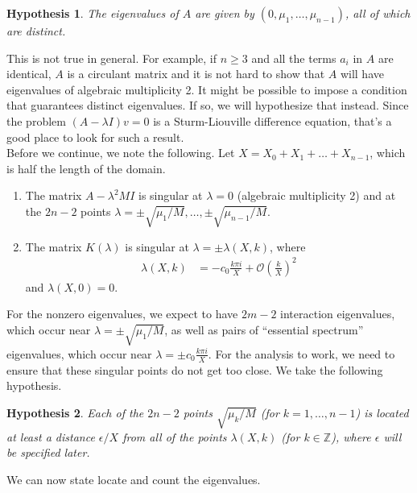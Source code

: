 \documentclass[12pt]{article}
\def\Z{{\mathbb Z}}
\newtheorem{hypothesis}{Hypothesis}
\begin{document}
\begin{hypothesis}\label{eigAdistinct}
The eigenvalues of $A$ are given by $(0, \mu_1, \dots, \mu_{n-1})$, all of which are distinct.
\end{hypothesis}

This is not true in general. For example, if $n \geq 3$ and all the terms $a_i$ in $A$ are identical, $A$ is a circulant matrix and it is not hard to show that $A$ will have eigenvalues of algebraic multiplicity 2. It might be possible to impose a condition that guarantees distinct eigenvalues. If so, we will hypothesize that instead. Since the problem $(A - \lambda I)v = 0$ is a Sturm-Liouville difference equation, that's a good place to look for such a result.\\

Before we continue, we note the following. Let $X = X_0 + X_1 + \dots + X_{n-1}$, which is half the length of the domain.

\begin{enumerate}
	\item The matrix $A - \lambda^2 M I$ is singular at $\lambda = 0$ (algebraic multiplicity 2) and at the $2n-2$ points $\lambda = \pm \sqrt{\mu_1/M}, \dots, \pm \sqrt{\mu_{n-1}/M}$.

	\item The matrix $K(\lambda)$ is singular at $\lambda = \pm \lambda(X,k)$, where
	\begin{align}\label{lambdaXk}
	\lambda(X,k)
		&= -c_0 \frac{k \pi i }{X} + \mathcal{O}\left(\frac{k}{X}\right)^2 
	\end{align} 
	and $\lambda(X, 0) = 0$.
\end{enumerate}  

For the nonzero eigenvalues, we expect to have $2m-2$ interaction eigenvalues, which occur near $\lambda = \pm \sqrt{\mu_1/M}$, as well as pairs of ``essential spectrum'' eigenvalues, which occur near $\lambda = \pm c_0 \frac{k \pi i }{X}$. For the analysis to work, we need to ensure that these singular points do not get too close. We take the following hypothesis.

\begin{hypothesis}\label{epsilonballs}
Each of the $2n - 2$ points $\sqrt{\mu_k/M}$ (for $k = 1, \dots, n-1$) is located at least a distance $\epsilon/X$ from all of the points $\lambda(X,k)$ (for $k \in \Z$), where $\epsilon$ will be specified later.
\end{hypothesis}

We can now state locate and count the eigenvalues.
\end{document}
